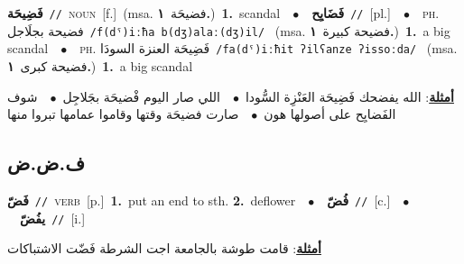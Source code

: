 \documentclass[10pt,a4paper,twoside]{article} %
\begin{document}
\begin{multicols}{2}
{\setlength\topsep{0pt}\textbf{\foreignlanguage{arabic}{فَضِيحَة}}\ {\color{gray}\texttt{//}\color{black}}\ \textsc{noun}\ [f.]\ \color{gray}(msa. \foreignlanguage{arabic}{فضيحَة}~\foreignlanguage{arabic}{\textbf{١.}})\color{black}\ \textbf{1.}~scandal\ \ $\bullet$\ \ \setlength\topsep{0pt}\textbf{\foreignlanguage{arabic}{فَضَايِح}}\ {\color{gray}\texttt{//}\color{black}}\ [pl.]\ \ $\bullet$\ \ \textsc{ph.} \color{gray} \foreignlanguage{arabic}{فضيحة بجلَاجل}\color{black}\ {\color{gray}\texttt{/{\sffamily f(dˤ)iːħa b(dʒ)alaː(dʒ)il}/}\color{black}}\ \color{gray} (msa. \foreignlanguage{arabic}{فضيحة كبيرة}~\foreignlanguage{arabic}{\textbf{١.}})\color{black}\ \textbf{1.}~a big scandal\ \ $\bullet$\ \ \textsc{ph.} \color{gray} \foreignlanguage{arabic}{فَضِيحَة العنزة السودَا}\color{black}\ {\color{gray}\texttt{/{\sffamily fa(dˤ)iːħit ʔilʕanze ʔissoːda}/}\color{black}}\ \color{gray} (msa. \foreignlanguage{arabic}{فضيحة كبرى}~\foreignlanguage{arabic}{\textbf{١.}})\color{black}\ \textbf{1.}~a big scandal\  \begin{flushright}\color{gray}\foreignlanguage{arabic}{\textbf{\underline{\foreignlanguage{arabic}{أمثلة}}}: الله يفضحك فَضِيحَة العَنْزِة السُّودا\ $\bullet$\ \  اللي صار اليوم فْضيحَة بجَلاجِل\ $\bullet$\ \  شوف الفَضايِح على أصولها هون\ $\bullet$\ \  صارت فضيحَة وقتها وقاموا عمامها تبروا منها}\end{flushright}\color{black}} \vspace{2mm}

\vspace{-3mm}
\subsection*{\color{blue}\foreignlanguage{arabic}{ف.ض.ض}\color{blue}{}} 

{\setlength\topsep{0pt}\textbf{\foreignlanguage{arabic}{فَضّ}}\ {\color{gray}\texttt{//}\color{black}}\ \textsc{verb}\ [p.]\ \textbf{1.}~put an end to sth.  \textbf{2.}~deflower\ \ $\bullet$\ \ \setlength\topsep{0pt}\textbf{\foreignlanguage{arabic}{فُضّ}}\ {\color{gray}\texttt{//}\color{black}}\ [c.]\ \ $\bullet$\ \ \setlength\topsep{0pt}\textbf{\foreignlanguage{arabic}{يفُضّ}}\ {\color{gray}\texttt{//}\color{black}}\ [i.]\  \begin{flushright}\color{gray}\foreignlanguage{arabic}{\textbf{\underline{\foreignlanguage{arabic}{أمثلة}}}: قامت طوشة بالجامعة اجت الشرطة فَضّت الاشتباكات}\end{flushright}\color{black}} \vspace{2mm}


\end{multicols}
\end{document}
